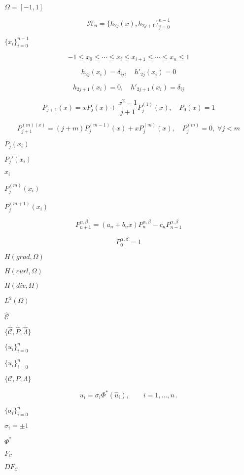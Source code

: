 \documentclass{article}
\begin{document}
$\Omega=[-1,1]$
\pagebreak

\[\mathcal{H}_n = \{h_{2j}(x),h_{2j+1}\}_{j=0}^{n-1} \]
\pagebreak

$\{x_i\}_{i=0}^{n-1}$
\pagebreak

\[ -1\leq x_0 \leq \cdots \leq x_i \leq x_{i+1} \leq \cdots \leq x_n \leq 1 \]
\pagebreak

\[ h_{2j}(x_i) = \delta_{ij},\quad h'_{2j}(x_i) = 0 \]
\pagebreak

\[ h_{2j+1}(x_i) = 0,\quad h'_{2j+1}(x_i) = \delta_{ij} \]
\pagebreak

\[ P_{j+1}(x) = x P_j(x) + \frac{x^2-1}{j+1}P_j^{(1)}(x),\quad P_0(x) = 1 \]
\pagebreak

\[ P_{j+1}^{(m)(x)} = (j+m)P_j^{(m-1)}(x) + x P_j^{(m)}(x),\quad P_j^{(m)} = 0,\;\forall j<m\]
\pagebreak

$P_j(x_i)$
\pagebreak

$P_j'(x_i)$
\pagebreak

$x_i$
\pagebreak

$P_j^{(m)}(x_i) $
\pagebreak

$P_j^{(m+1)}(x_i)  $
\pagebreak

\[
P^{\alpha,\beta}_{n+1} = \left( a_n + b_n x\right) P^{\alpha,\beta}_n - c_n P^{\alpha,\beta}_{n-1}
\]
\pagebreak

\[
P^{\alpha,\beta}_0 = 1
\]
\pagebreak

$H(grad,\Omega)$
\pagebreak

$H(curl,\Omega)$
\pagebreak

$H(div,\Omega)$
\pagebreak

$L^2(\Omega)$
\pagebreak

$\widehat{{\mathcal C}}$
\pagebreak

$\{\widehat{{\mathcal C}},\widehat{P},\widehat{\Lambda}\}$
\pagebreak

$\{\widehat{u}_i\}_{i=0}^n$
\pagebreak

$\{{u}_i\}_{i=0}^n$
\pagebreak

$\{{\mathcal C},P,\Lambda\}$
\pagebreak

\[
      u_i = \sigma_i \Phi^*(\widehat{u}_i), \qquad i=1,\ldots,n \,.
 \]
\pagebreak

$\{\sigma_i\}_{i=0}^n$
\pagebreak

$\sigma_i = \pm 1$
\pagebreak

$\Phi^*$
\pagebreak

$F_{\mathcal C}$
\pagebreak

$DF_{\mathcal C}$
\pagebreak
\end{document}
